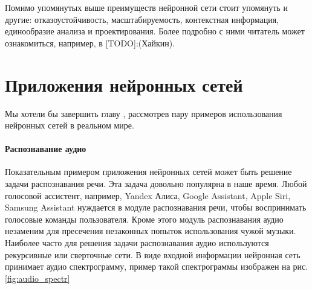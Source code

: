 \documentclass[a4paper,12pt]{report}
\begin{document}
Помимо упомянутых выше преимуществ нейронной сети стоит упомянуть и
другие: отказоустойчивость, масштабируемость, контекстная информация,
единообразие анализа и проектирования. Более подробно с ними читатель
может ознакомиться, например, в [TODO]:(Хайкин).

\section{Приложения нейронных сетей}
Мы хотели бы завершить главу ,
рассмотрев пару примеров использования нейронных сетей в реальном
мире.

\paragraph{Распознавание аудио}
%
%
%
Показательным примером приложения нейронных сетей может быть решение
задачи распознавания речи. Эта задача довольно популярна в наше время.
Любой голосовой ассистент, например, Yandex Алиса, Google Assistant,
Apple Siri, Samsung Assistant нуждается в модуле распознавания речи,
чтобы воспринимать голосовые команды пользователя. Кроме этого модуль распознавания
аудио незаменим для пресечения незаконных попыток использования чужой
музыки. Наиболее часто для решения задачи распознавания аудио
используются рекурсивные или сверточные сети. В виде входной
информации нейронная сеть принимает аудио спектрограмму, пример такой
спектрограммы изображен на рис. \ref{fig:audio_spectr}
\end{document}

